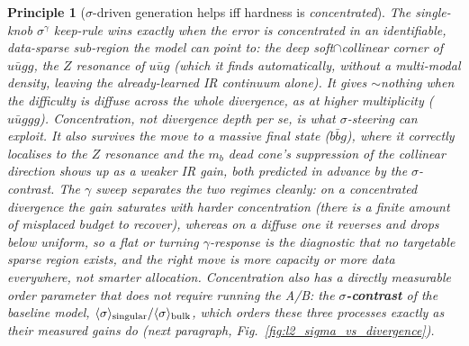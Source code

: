 \documentclass[11pt]{article}
\newtheorem{principle}{Principle}
\begin{document}
\begin{principle}[$\sigma$-driven generation helps iff hardness is \emph{concentrated}]
The single-knob $\sigma^\gamma$ keep-rule wins exactly when the error is concentrated in an identifiable,
data-sparse sub-region the model can point to: the deep soft$\cap$collinear corner of $u\bar u gg$, the
$Z$ resonance of $u\bar u g$ (which it finds automatically, without a multi-modal density, leaving the
already-learned IR continuum alone). It gives $\sim\!$nothing when the difficulty is diffuse across the
whole divergence, as at higher multiplicity ($u\bar u ggg$). Concentration, not divergence depth per se, is
what $\sigma$-steering can exploit. It also survives the move to a \emph{massive} final state ($b\bar b g$),
where it correctly localises to the $Z$ resonance and the $m_b$ dead cone's suppression of the collinear
direction shows up as a weaker IR gain, both predicted in advance by the $\sigma$-contrast. The $\gamma$ sweep separates the two regimes cleanly: on a concentrated
divergence the gain \emph{saturates} with harder concentration (there is a finite amount of misplaced
budget to recover), whereas on a diffuse one it \emph{reverses} and drops below uniform, so a flat or
turning $\gamma$-response is the diagnostic that no targetable sparse region exists, and the right move is
more capacity or more data everywhere, not smarter allocation. Concentration also has a directly
measurable order parameter that does \emph{not} require running the A/B: the \textbf{$\sigma$-contrast}
of the baseline model, $\langle\sigma\rangle_{\rm singular}/\langle\sigma\rangle_{\rm bulk}$, which
orders these three processes exactly as their measured gains do (next paragraph,
Fig.~\ref{fig:l2_sigma_vs_divergence}).
\end{principle}
\end{document}
